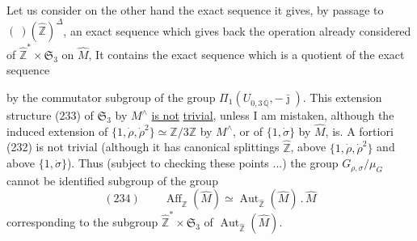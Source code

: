 Let us consider on the other hand the exact sequence
it gives, by passage to $(\ )(\widehat{\mathbb Z})^\Delta$, an exact sequence
which gives back the operation already considered of $\widehat{\mathbb Z}^{*}\times\mathfrak S_3$
on $\widehat M$, It contains the exact sequence
which  is a quotient of the  exact sequence




by the  commutator subgroup
of the group $\Pi_1(U_{0,3\,\overline{\mathbb Q}},-\bar{\jmath})$.
This  extension structure (233) of $\mathfrak S_3$
by $M^\wedge$ \uline{is not} \uline{trivial}, unless I am mistaken,
although the induced extension of
$\{1,\dot\rho,\dot\rho^2\}\simeq\mathbb Z/3\mathbb Z$ by $M^\wedge$,
or of $\{1,\dot\sigma\}$ by $\widehat M$, is.
A fortiori (232) is not trivial (although it has canonical
splittings  $\widehat{\mathbb Z}$, above
$\{1,\dot\rho,\dot\rho^2\}$ and above $\{1,\dot\sigma\}$).
Thus (subject to checking these points ...)
the group $G_{\rho,\sigma}/\mu_G$ cannot be identified
 subgroup of the  group
\[
(234)\qquad
\boxed{\operatorname{Aff}_{\widehat{\mathbb Z}}(\widehat M)
\simeq\operatorname{Aut}_{\widehat{\mathbb Z}}(\widehat M)\mathbin{.}\widehat M}
\]
corresponding to the subgroup $\widehat{\mathbb Z}^{*}\times\mathfrak S_3$
of $\operatorname{Aut}_{\widehat{\mathbb Z}}(\widehat M)$.

